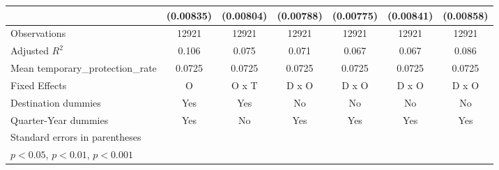 \begin{table}[htbp]
\begin{tabular}{l*{6}{c}}
                    &   (0.00835)         &   (0.00804)         &   (0.00788)         &   (0.00775)         &   (0.00841)         &   (0.00858)         \\
\hline
Observations        &       12921         &       12921         &       12921         &       12921         &       12921         &       12921         \\
Adjusted \(R^{2}\)  &       0.106         &       0.075         &       0.071         &       0.067         &       0.067         &       0.086         \\
Mean temporary\_protection\_rate&      0.0725         &      0.0725         &      0.0725         &      0.0725         &      0.0725         &      0.0725         \\
Fixed Effects       &           O         &       O x T         &       D x O         &       D x O         &       D x O         &       D x O         \\
Destination dummies &         Yes         &         Yes         &          No         &          No         &          No         &          No         \\
Quarter-Year dummies&         Yes         &          No         &         Yes         &         Yes         &         Yes         &         Yes         \\
\hline\hline
\multicolumn{7}{l}{\footnotesize Standard errors in parentheses}\\
\multicolumn{7}{l}{\footnotesize \sym{*} \(p<0.05\), \sym{**} \(p<0.01\), \sym{***} \(p<0.001\)}\\
\end{tabular}
\end{table}
